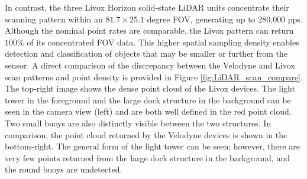 \documentclass[../main.tex]{subfiles}
\begin{document}

In contrast, the three Livox Horizon solid-state \ac{LiDAR} units concentrate their scanning pattern within an $81.7 \times 25.1$ degree \ac{FOV}, generating up to 280,000 \ac{pps}. 
Although the nominal point rates are comparable, the Livox pattern can return $100 \%$ of its concentrated \ac{FOV} data. 
This higher spatial sampling density enables detection and classification of objects that may be smaller or further from the sensor.
A direct comparison of the discrepancy between the Velodyne and Livox scan patterns and point density is provided in Figure \ref{fig:LiDAR_scan_compare}.
The top-right image shows the dense point cloud of the Livox devices.
The light tower in the foreground and the large dock structure in the background can be seen in the camera view (left) and are both well defined in the red point cloud.
Two small buoys are also distinctly visible between the two structures.
In comparison, the point cloud returned by the Velodyne devices is shown in the bottom-right. 
The general form of the light tower can be seen; however, there are very few points returned from the large dock structure in the background, and the round buoys are undetected.
\end{document}
